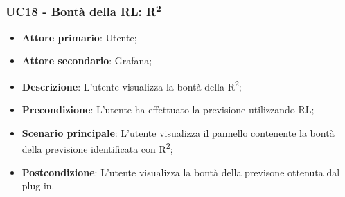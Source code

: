 \subsubsection{UC18 - Bontà della RL: R\textsuperscript{2}}
\label{sssec:uc18}
\begin{itemize}
  \item \textbf{Attore primario}: Utente;
  \item \textbf{Attore secondario}: Grafana;
  \item \textbf{Descrizione}: L'utente visualizza la bontà della R\textsuperscript{2};
  \item \textbf{Precondizione}: L'utente ha effettuato la previsione utilizzando RL;
  \item \textbf{Scenario principale}: L'utente visualizza il pannello contenente la bontà della previsione identificata con R\textsuperscript{2};
  \item \textbf{Postcondizione}: L'utente visualizza la bontà della previsone ottenuta dal plug-in.
\end{itemize}
